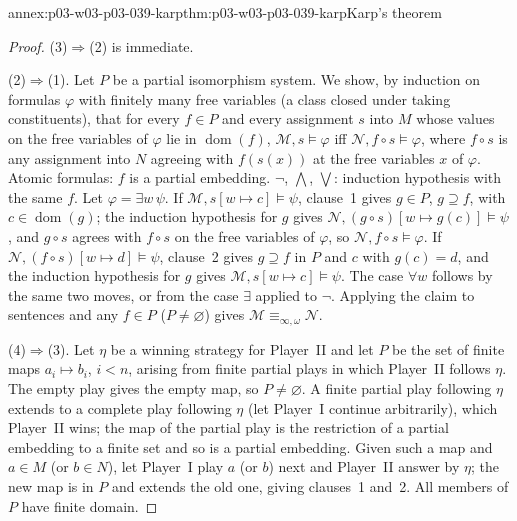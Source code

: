 \begin{annexitem}{annex:p03-w03-p03-039-karp}{thm:p03-w03-p03-039-karp}{Karp's theorem}
\begin{proof}
(3)\(\Rightarrow\)(2) is immediate.

(2)\(\Rightarrow\)(1). Let \(P\) be a partial isomorphism system. We show,
by induction on formulas \(\varphi\) with finitely many free variables
(a class closed under taking constituents), that for every \(f\in P\) and
every assignment \(s\) into \(M\) whose values on the free variables of
\(\varphi\) lie in \(\operatorname{dom}(f)\),
\(\mathcal M,s\models\varphi\) iff \(\mathcal N,f\circ s\models\varphi\),
where \(f\circ s\) is any assignment into \(N\) agreeing with \(f(s(x))\) at
the free variables \(x\) of \(\varphi\). Atomic formulas: \(f\) is a partial
embedding. \(\neg\), \(\bigwedge\), \(\bigvee\): induction hypothesis with the
same \(f\). Let \(\varphi=\exists w\,\psi\). If
\(\mathcal M,s[w\mapsto c]\models\psi\), clause~1 gives \(g\in P\),
\(g\supseteq f\), with \(c\in\operatorname{dom}(g)\); the induction hypothesis
for \(g\) gives \(\mathcal N,(g\circ s)[w\mapsto g(c)]\models\psi\), and
\(g\circ s\) agrees with \(f\circ s\) on the free variables of \(\varphi\), so
\(\mathcal N,f\circ s\models\varphi\). If
\(\mathcal N,(f\circ s)[w\mapsto d]\models\psi\), clause~2 gives
\(g\supseteq f\) in \(P\) and \(c\) with \(g(c)=d\), and the induction
hypothesis for \(g\) gives \(\mathcal M,s[w\mapsto c]\models\psi\). The case
\(\forall w\) follows by the same two moves, or from the case \(\exists\)
applied to \(\neg\). Applying the claim to sentences and any \(f\in P\)
(\(P\ne\varnothing\)) gives \(\mathcal M\equiv_{\infty,\omega}\mathcal N\).

(4)\(\Rightarrow\)(3). Let \(\eta\) be a winning strategy for Player~II and
let \(P\) be the set of finite maps \(a_i\mapsto b_i\), \(i<n\), arising from
finite partial plays in which Player~II follows \(\eta\). The empty play
gives the empty map, so \(P\ne\varnothing\). A finite partial play following
\(\eta\) extends to a complete play following \(\eta\) (let Player~I continue
arbitrarily), which Player~II wins; the map of the partial play is the
restriction of a partial embedding to a finite set and so is a partial
embedding. Given such a map and \(a\in M\) (or \(b\in N\)), let Player~I play
\(a\) (or \(b\)) next and Player~II answer by \(\eta\); the new map is in
\(P\) and extends the old one, giving clauses~1 and~2. All members of \(P\)
have finite domain.


\end{proof}
\end{annexitem}
